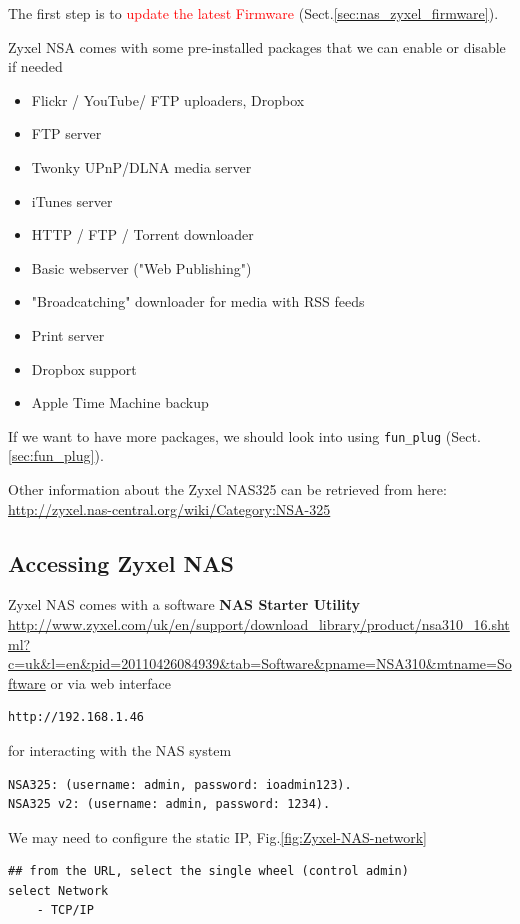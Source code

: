 The first step is to \textcolor{red}{update the latest Firmware}
(Sect.\ref{sec:nas_zyxel_firmware}).

Zyxel NSA comes with some pre-installed packages that we can enable or disable
if needed
\begin{itemize}
  \item Flickr / YouTube/ FTP uploaders, Dropbox
  \item FTP server
  \item  Twonky UPnP/DLNA media server
  \item iTunes server
  \item  HTTP / FTP / Torrent downloader
  \item Basic webserver ("Web Publishing")
  \item  "Broadcatching" downloader for media with RSS feeds
  \item  Print server
  \item  Dropbox support
  \item  Apple Time Machine backup
\end{itemize}
If we want to have more packages, we should look into using \verb!fun_plug!
(Sect.\ref{sec:fun_plug}).

Other information about the Zyxel NAS325 can be retrieved from here: 
\url{http://zyxel.nas-central.org/wiki/Category:NSA-325}

\subsection{Accessing Zyxel NAS}
\label{sec:access-Zyxel-NAS}

Zyxel NAS comes with a software {\bf NAS Starter Utility} 
\url{http://www.zyxel.com/uk/en/support/download_library/product/nsa310_16.shtml?c=uk&l=en&pid=20110426084939&tab=Software&pname=NSA310&mtname=Software}
or via web interface
\begin{verbatim}
http://192.168.1.46
\end{verbatim}
for interacting with the NAS system 
\begin{verbatim}
NSA325: (username: admin, password: ioadmin123).
NSA325 v2: (username: admin, password: 1234).
\end{verbatim}
We may need to configure the static IP, Fig.\ref{fig:Zyxel-NAS-network}
\begin{verbatim}
## from the URL, select the single wheel (control admin)
select Network 
    - TCP/IP
\end{verbatim}

